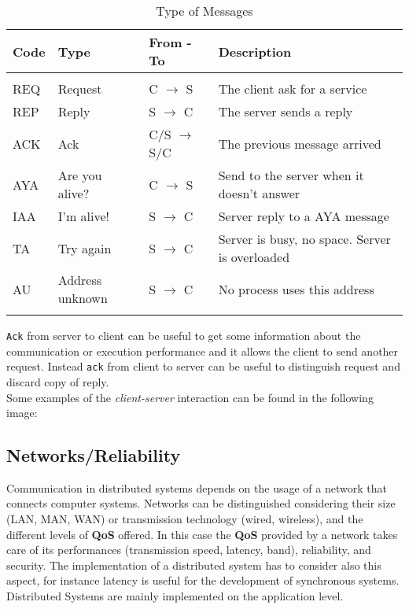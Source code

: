 \begin{table}[H]
\centering
\begin{tabular}{ |p{1cm}||p{3cm}|p{2cm}|p{6cm}|  }
    \hline
    \textbf{Code} & \textbf{Type} & \textbf{From - To} & \textbf{Description}\\
    \hline
    &&&\\
    REQ& Request &C $\rightarrow$ S& The client ask for a service\\
    REP& Reply & S $\rightarrow$ C & The server sends a reply\\
    ACK& Ack & C/S $\rightarrow$ S/C & The previous message arrived\\
    AYA& Are you alive? & C $\rightarrow$ S & Send to the server when it doesn't answer\\
    IAA& I'm alive! & S $\rightarrow$ C & Server reply to a AYA message\\
    TA& Try again & S $\rightarrow$ C & Server is busy, no space. Server is overloaded\\
    AU& Address unknown & S $\rightarrow$ C & No process uses this address\\
    &&&\\
    \hline
\end{tabular}
\caption{Type of Messages}
\label{table:type-of-message}
\end{table}
\verb!Ack! from server to client can be useful to get some information about the communication or execution performance and it allows the client to send another request. Instead \verb!ack! from client to server can be useful to distinguish request and discard copy of reply.\\
Some examples of the \textit{client-server} interaction can be found in the following image: 

\subsection{Networks/Reliability}
Communication in distributed systems depends on the usage of a network that connects computer systems. Networks can be distinguished considering their size (LAN, MAN, WAN) or transmission technology (wired, wireless), and the different levels of \textbf{QoS} offered. In this case the \textbf{QoS} provided by a network takes care of its performances (transmission speed, latency, band), reliability, and security. The implementation of a distributed system has to consider also this aspect, for instance latency is useful for the development of synchronous systems.
Distributed Systems are mainly implemented on the application level.

